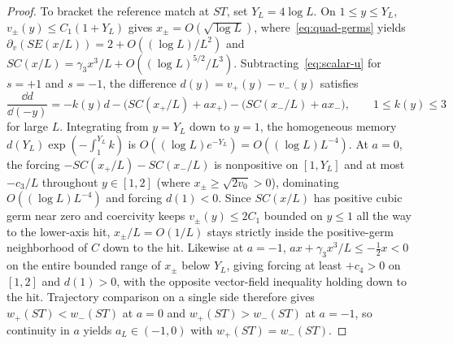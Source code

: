 \begin{proof}
To bracket the reference match at $ST$, set $Y_L=4\log L$. On $1\le y\le Y_L$, $v_\pm(y)\le C_1(1+Y_L)$ gives $x_\pm=O(\sqrt{\log L})$, where~\eqref{eq:quad-germs} yields $\partial_v(SE(x/L))=2+O((\log L)/L^2)$ and $SC(x/L)=\gamma_3 x^3/L+O((\log L)^{5/2}/L^3)$. Subtracting~\eqref{eq:scalar-u} for $s=+1$ and $s=-1$, the difference $d(y)=v_+(y)-v_-(y)$ satisfies
\[
  \frac{\dd d}{\dd(-y)} = -k(y)d - \big(SC(x_+/L)+ax_+\big) - \big(SC(x_-/L)+ax_-\big),\qquad 1\le k(y)\le 3
\]
for large $L$. Integrating from $y=Y_L$ down to $y=1$, the homogeneous memory $d(Y_L)\exp(-\int_1^{Y_L}k)$ is $O((\log L)e^{-Y_L})=O((\log L)L^{-4})$. At $a=0$, the forcing $-SC(x_+/L)-SC(x_-/L)$ is nonpositive on $[1,Y_L]$ and at most $-c_3/L$ throughout $y\in[1,2]$ (where $x_\pm\ge\sqrt{2v_0}>0$), dominating $O((\log L)L^{-4})$ and forcing $d(1)<0$. Since $SC(x/L)$ has positive cubic germ near zero and coercivity keeps $v_\pm(y)\le 2C_1$ bounded on $y\le 1$ all the way to the lower-axis hit, $x_\pm/L=O(1/L)$ stays strictly inside the positive-germ neighborhood of $C$ down to the hit. Likewise at $a=-1$, $ax+\gamma_3 x^3/L\le -\tfrac12 x<0$ on the entire bounded range of $x_\pm$ below $Y_L$, giving forcing at least $+c_4>0$ on $[1,2]$ and $d(1)>0$, with the opposite vector-field inequality holding down to the hit. Trajectory comparison on a single side therefore gives $w_+(ST)<w_-(ST)$ at $a=0$ and $w_+(ST)>w_-(ST)$ at $a=-1$, so continuity in $a$ yields $a_L\in(-1,0)$ with $w_+(ST)=w_-(ST)$.


\end{proof}
